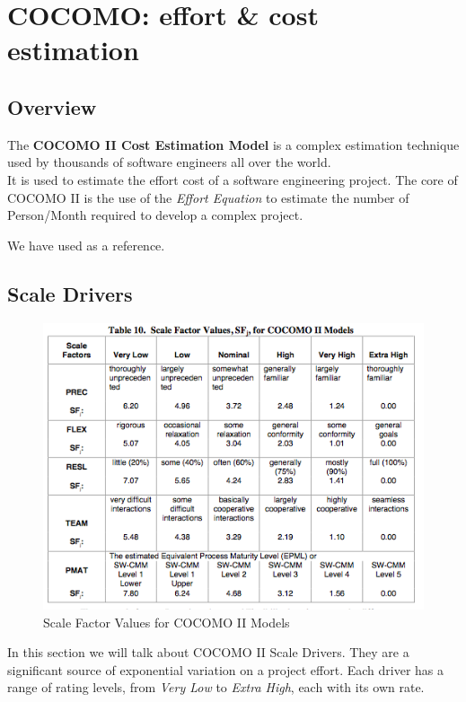 \section{COCOMO: effort \& cost estimation}
\label{sec:cocomo}
\subsection{Overview} %
\label{sub:cocomo_overview}
The \textbf{COCOMO II Cost Estimation Model} is a complex estimation technique used 
by thousands of software engineers all over the world. \\
It is used to estimate the effort cost of a software engineering project.
The core of COCOMO II is the use of the \emph{Effort Equation} to estimate the number
of Person/Month required to develop a complex project.

We have used \cite{bib:cocomo} as a reference.

\subsection{Scale Drivers} %
\label{sub:scale_drivers}
\begin{figure}[h]
    \includegraphics[trim={0.23cm 0.2cm 0.43cm 0.55cm},clip,width=\linewidth]{img/scaledriver.png}
    \caption{Scale Factor Values for COCOMO II Models}
    \label{tbl:scale}
\end{figure}

\pagebreak 
In this section we will talk about COCOMO II Scale Drivers. They are a significant
source of exponential variation on a project effort. Each driver has a range of 
rating levels, from \emph{Very Low} to \emph{Extra High}, each with its own rate. 

